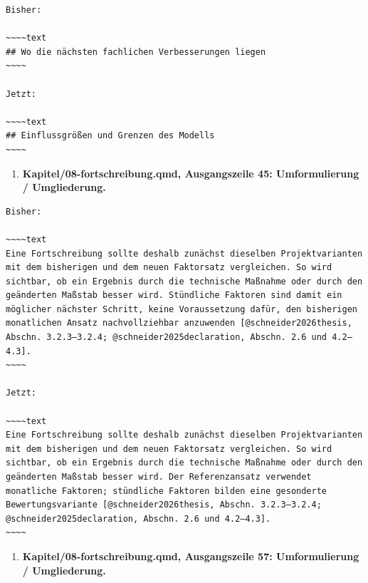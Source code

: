 \documentclass[
  ngerman,
  a4paper,
  DIV=11]{scrreprt}
\providecommand{\tightlist}{%
  \setlength{\itemsep}{0pt}\setlength{\parskip}{0pt}}
\begin{document}
\begin{verbatim}
Bisher:

~~~~text
## Wo die nächsten fachlichen Verbesserungen liegen
~~~~

Jetzt:

~~~~text
## Einflussgrößen und Grenzen des Modells
~~~~
\end{verbatim}

\begin{enumerate}
\def\labelenumi{\arabic{enumi}.}
\setcounter{enumi}{121}
\tightlist
\item
  \textbf{Kapitel/08-fortschreibung.qmd, Ausgangszeile 45:
  Umformulierung / Umgliederung.}
\end{enumerate}

\begin{verbatim}
Bisher:

~~~~text
Eine Fortschreibung sollte deshalb zunächst dieselben Projektvarianten mit dem bisherigen und dem neuen Faktorsatz vergleichen. So wird sichtbar, ob ein Ergebnis durch die technische Maßnahme oder durch den geänderten Maßstab besser wird. Stündliche Faktoren sind damit ein möglicher nächster Schritt, keine Voraussetzung dafür, den bisherigen monatlichen Ansatz nachvollziehbar anzuwenden [@schneider2026thesis, Abschn. 3.2.3–3.2.4; @schneider2025declaration, Abschn. 2.6 und 4.2–4.3].
~~~~

Jetzt:

~~~~text
Eine Fortschreibung sollte deshalb zunächst dieselben Projektvarianten mit dem bisherigen und dem neuen Faktorsatz vergleichen. So wird sichtbar, ob ein Ergebnis durch die technische Maßnahme oder durch den geänderten Maßstab besser wird. Der Referenzansatz verwendet monatliche Faktoren; stündliche Faktoren bilden eine gesonderte Bewertungsvariante [@schneider2026thesis, Abschn. 3.2.3–3.2.4; @schneider2025declaration, Abschn. 2.6 und 4.2–4.3].
~~~~
\end{verbatim}

\begin{enumerate}
\def\labelenumi{\arabic{enumi}.}
\setcounter{enumi}{122}
\tightlist
\item
  \textbf{Kapitel/08-fortschreibung.qmd, Ausgangszeile 57:
  Umformulierung / Umgliederung.}
\end{enumerate}
\end{document}
